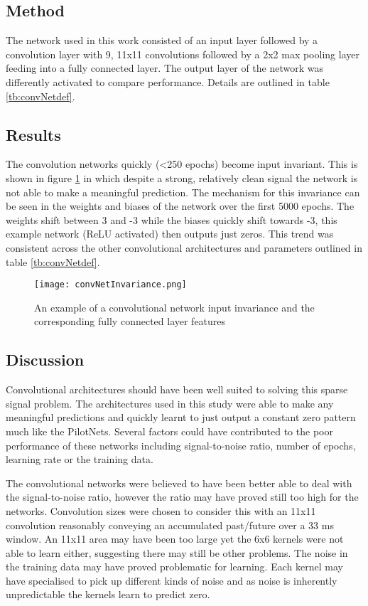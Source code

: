 \subsection{Method}
\label{sec:convMethod}
The network used in this work consisted of an input layer followed by a convolution layer with 9, 11x11 convolutions followed by a 2x2 max pooling layer feeding into a fully connected layer. 
The output layer of the network was differently activated to compare performance. 
Details are outlined in table \ref{tb:convNetdef}.


\subsection{Results}
The convolution networks quickly (\textless 250 epochs) become input invariant.
This is shown in figure \ref{fig:convInputInvariance} in which despite a strong, relatively clean signal the network is not able to make a meaningful prediction. 
The mechanism for this invariance can be seen in the weights and biases of the network over the first 5000 epochs.
The weights shift between 3 and -3 while the biases quickly shift towards -3, this example network (ReLU activated) then outputs just zeros.
This trend was consistent across the other convolutional architectures and parameters outlined in table \ref{tb:convNetdef}.

\begin{figure}[h]
    \centering
    \texttt{[image: convNetInvariance.png]}
    \caption{An example of a convolutional network input invariance and the corresponding fully connected layer features}
    \label{fig:convInputInvariance}
\end{figure}

\subsection{Discussion}
Convolutional architectures should have been well suited to solving this sparse signal problem.
The architectures used in this study were able to make any meaningful predictions and quickly learnt to just output a constant zero pattern much like the PilotNets.
Several factors could have contributed to the poor performance of these networks including signal-to-noise ratio, number of epochs, learning rate or the training data. 

The convolutional networks were believed to have been better able to deal with the signal-to-noise ratio, however the ratio may have proved still too high for the networks.
Convolution sizes were chosen to consider this with an 11x11 convolution reasonably conveying an accumulated past/future over a 33 ms window. 
An 11x11 area may have been too large yet the 6x6 kernels were not able to learn either, suggesting there may still be other problems.
The noise in the training data may have proved problematic for learning. 
Each kernel may have specialised to pick up different kinds of noise and as noise is inherently unpredictable the kernels learn to predict zero. 

